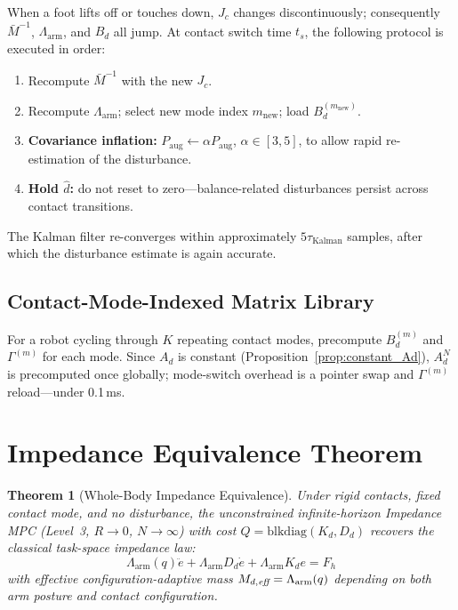 \documentclass[journal]{IEEEtran}
\newtheorem{theorem}{Theorem}
\newcommand{\Mbar}{\bar{M}^{-1}}
\newcommand{\Larm}{\Lambda_{\text{arm}}}
\newcommand{\dhat}{\hat{d}}
\begin{document}
When a foot lifts off or touches down, $J_c$ changes discontinuously;
consequently $\Mbar$, $\Larm$, and $B_d$ all jump.
At contact switch time $t_s$, the following protocol is executed in order:
\begin{enumerate}
  \item Recompute $\Mbar$ with the new $J_c$.
  \item Recompute $\Larm$; select new mode index $m_{\text{new}}$; load $B_d^{(m_{\text{new}})}$.
  \item \textbf{Covariance inflation:} $P_{\text{aug}}\leftarrow\alpha P_{\text{aug}}$,
        $\alpha\in[3,5]$, to allow rapid re-estimation of the disturbance.
  \item \textbf{Hold $\dhat$:} do not reset to zero---balance-related
        disturbances persist across contact transitions.
\end{enumerate}
The Kalman filter re-converges within approximately $5\tau_{\text{Kalman}}$
samples, after which the disturbance estimate is again accurate.

\subsection{Contact-Mode-Indexed Matrix Library}

For a robot cycling through $K$ repeating contact modes, precompute
$B_d^{(m)}$ and $\Gamma^{(m)}$ for each mode.
Since $A_d$ is constant (Proposition~\ref{prop:constant_Ad}), $A_d^N$ is
precomputed once globally; mode-switch overhead is a pointer swap and
$\Gamma^{(m)}$ reload---under 0.1\,ms.

\section{Impedance Equivalence Theorem}\label{sec:theorem}

\begin{theorem}[Whole-Body Impedance Equivalence]\label{thm:equivalence}
Under rigid contacts, fixed contact mode, and no disturbance, the
unconstrained infinite-horizon Impedance MPC (Level~3, $R\to0$, $N\to\infty$)
with cost $Q=\mathrm{blkdiag}(K_d,D_d)$ recovers the classical task-space
impedance law:
\begin{equation}\label{eq:impedance}
  \Larm(q)\ddot{e}+\Larm D_d\dot{e}+\Larm K_d e = F_h
\end{equation}
with effective configuration-adaptive mass $M_{d,\emph{eff}}=\Larm(q)$
depending on both arm posture and contact configuration.
\end{theorem}
\end{document}
